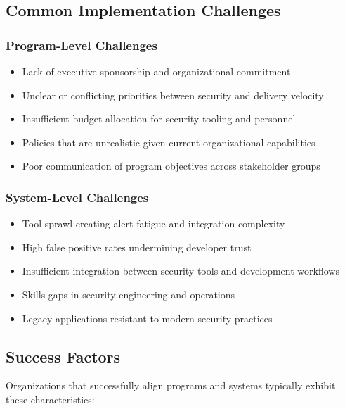 \documentclass[11pt,letterpaper]{article}
\begin{document}
\subsection{Common Implementation Challenges}

\subsubsection{Program-Level Challenges}

\begin{itemize}[leftmargin=2em]
    \item Lack of executive sponsorship and organizational commitment
    \item Unclear or conflicting priorities between security and delivery velocity
    \item Insufficient budget allocation for security tooling and personnel
    \item Policies that are unrealistic given current organizational capabilities
    \item Poor communication of program objectives across stakeholder groups
\end{itemize}

\subsubsection{System-Level Challenges}

\begin{itemize}[leftmargin=2em]
    \item Tool sprawl creating alert fatigue and integration complexity
    \item High false positive rates undermining developer trust
    \item Insufficient integration between security tools and development workflows
    \item Skills gaps in security engineering and operations
    \item Legacy applications resistant to modern security practices
\end{itemize}

\subsection{Success Factors}

Organizations that successfully align programs and systems typically exhibit these characteristics:
\end{document}
